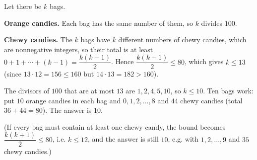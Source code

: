 Let there be $k$ bags.

\textbf{Orange candies.} Each bag has the same number of them, so $k$ divides $100$.

\textbf{Chewy candies.} The $k$ bags have $k$ different numbers of chewy candies, which are nonnegative integers, so their total is at least $0+1+\cdots+(k-1)=\dfrac{k(k-1)}{2}$. Hence $\dfrac{k(k-1)}{2}\le80$, which gives $k\le13$ (since $13\cdot12=156\le160$ but $14\cdot13=182>160$).

The divisors of $100$ that are at most $13$ are $1,2,4,5,10$, so $k\le10$. Ten bags work: put $10$ orange candies in each bag and $0,1,2,\ldots,8$ and $44$ chewy candies (total $36+44=80$). The answer is $\boxed{10}$.

(If every bag must contain at least one chewy candy, the bound becomes $\dfrac{k(k+1)}{2}\le80$, i.e. $k\le12$, and the answer is still $10$, e.g. with $1,2,\ldots,9$ and $35$ chewy candies.)
